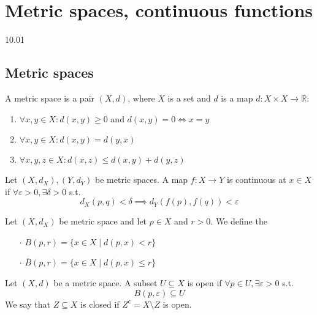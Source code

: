 \section{Metric spaces, continuous functions}
10.01

\subsection{Metric spaces}

\begin{definition}
  A metric space is a pair \( (X, d) \), where \( X \) is a set
  and \( d \) is a map \( d: X \times X \to \mathbb{R} \):
  \begin{enumerate}
    \item \( \forall x, y \in X : d(x, y) \ge 0 \) and \( d(x, y) = 0 \iff x = y \)
    \item \( \forall x, y \in X : d(x, y) = d(y, x) \)
    \item \( \forall x, y, z \in X : d(x, z) \le d(x, y) + d(y, z) \)
  \end{enumerate}
\end{definition}

\begin{definition}[Continuity]
  Let \( (X, d_X), (Y, d_Y) \) be metric spaces.
  A map \( f: X \to Y \) is continuous at \( x \in X \)
  if \( \forall \varepsilon > 0, \exists \delta > 0\) s.t.
  \[
    d_X(p, q) < \delta \implies d_Y(f(p), f(q)) < \varepsilon
  \]
\end{definition}

\begin{definition}[Balls]
   Let \( (X, d_X) \) be metric space and let 
   \( p \in X \) and \( r > 0 \). We define the

   \begin{enumerate}
     \item[\(\cdot\)] \( B(p, r) = \{ x \in X \mid d(p, x) < r \}  \)
     \item[\(\cdot\)] \( \overline{B}(p, r) = \{ x \in X \mid d(p, x) \le r \} \)
   \end{enumerate}
\end{definition}

\begin{definition}
   Let \( (X, d) \) be a metric space.
   A subset \( U \subseteq X \) is open
   if \( \forall p \in U, \exists \varepsilon > 0 \) s.t.
   \[
    B(p, \varepsilon) \subseteq U
   \]
   We say that \( Z \subseteq X \) is closed
   if \( Z^\mathsf{c} = X \setminus Z \) is open.
\end{definition}

